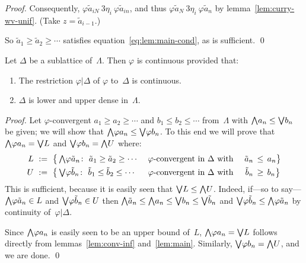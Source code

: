 \documentclass[main.tex]{subfiles}
\begin{document}
\begin{proof}
Consequently, $\varphi \tilde a_{iN} \ 3\eta_i\ \varphi\tilde a_{in}$,
and thus
$\varphi \tilde a_{N} \ 3\eta_i\ \varphi\tilde a_{n}$
by lemma~\ref{lem:curry-wv-unif}.
(Take $z=\tilde a_{i-1}$.)

So $\tilde a_1 \geq \tilde a_2 \geq \dotsb$
satisfies equation~\eqref{eq:lem:main-cond},
as is sufficient. \qed
\end{proof}
\begin{lem}
\label{lem:cont-ext-double}
Let $\Delta$ be a sublattice of~$\Lambda$.
Then $\varphi$ is continuous provided that:
\begin{enumerate}
\item
The restriction $\varphi|\Delta$ of $\varphi$ to~$\Delta$ is continuous.
\item
$\Delta$ is lower and upper dense in~$\Lambda$.
\end{enumerate}
\end{lem}
\begin{proof}
Let $\varphi$-convergent
$a_1 \geq a_2 \geq \dotsb$ and $b_1 \leq b_2 \leq \dotsb$ from~$\Lambda$
with $\textstyle{\bigwedge} a_n \leq \textstyle{\bigvee} b_n$ be given;
we will show that $\textstyle{\bigwedge} \varphi a_n \leq \textstyle{\bigvee} \varphi b_n$.
To this end we will prove that 
$\textstyle{\bigwedge} \varphi a_n = \textstyle{\bigvee} L$ and
$\textstyle{\bigvee} \varphi b_n = \textstyle{\bigwedge} U$
where:
\begin{alignat*}{3}
L\  &:=\ \bigl\{ \, \bw\varphi \tilde a_n \colon \ 
                 \tilde a_1 \geq \tilde a_2 \geq \dotsb \  &&
                 \varphi\text{-convergent in }
                 \Delta\text{ with }&\tilde a_n\,&\leq\, a_n \bigr\} \\
U\  &:=\ \bigl\{ \, \bv\varphi \tilde b_n \colon \ 
                 \tilde b_1 \leq \tilde b_2 \leq \dotsb \ &&
                 \varphi\text{-convergent in }
                 \Delta\text{ with }&\tilde b_n\,&\geq\,b_n \bigr\} \\
\end{alignat*}
This is sufficient,
because it is easily seen that $\textstyle{\bigvee} L \leq \textstyle{\bigwedge} U$.
Indeed,
if---so to say---$\textstyle{\bigwedge} \varphi \tilde a_n \in L$
and $\textstyle{\bigvee} \varphi \tilde b_n \in U$
then $\textstyle{\bigwedge}\tilde a_n \leq \textstyle{\bigwedge} a_n \leq \textstyle{\bigvee} b_n \leq \textstyle{\bigvee} \tilde b_n$
and $\textstyle{\bigvee} \varphi \tilde b_n \leq \textstyle{\bigwedge} \varphi \tilde a_n$
by continuity of~$\varphi|\Delta$.

Since $\textstyle{\bigwedge} \varphi a_n$ is easily seen to be an upper bound of~$L$,\quad
 $\textstyle{\bigwedge} \varphi a_n = \textstyle{\bigvee} L$\quad
follows directly from lemmas~\ref{lem:conv-inf} and~\ref{lem:main}.
Similarly, $\textstyle{\bigvee}\varphi b_n = \textstyle{\bigwedge} U$, 
and we are done. \qed
\end{proof}
\end{document}
